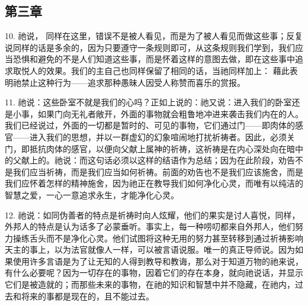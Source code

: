 
\subsection{第三章}

10.  祂说， 同样在这里，错误不是被人看见，而是为了被人看见而做这些事；反复说同样的话是多余的，因为只要遵守一条规则即可，从这条规则我们学到，我们应当恐惧和避免的不是人们知道这些事，而是怀着这样的意图去做，即在这些事中追求取悦人的效果。我们的主自己也同样保留了相同的话，当祂同样加上： 藉此表明祂禁止这种行为——追求那种愚昧人因受人称赞而喜乐的赏报。\par

11. 祂说：这些卧室不就是我们的心吗？正如上说的：祂又说：进入我们的卧室还是小事，如果门向无礼者敞开，外面的事物就会粗鲁地冲进来袭击我们内在的人。我们已经说过，外面的一切都是暂时的、可见的事物，它们通过门——即肉体的感官——进入我们的思想，并以一群虚幻的幻象喧闹地打扰祈祷者。因此，必须关门，即抵抗肉体的感官，以便向父献上属神的祈祷，这祈祷是在内心深处向在暗中的父献上的。祂说：而这句话必须以这样的结语作为总结；因为在此阶段，劝告不是我们应当祈祷，而是我们应当如何祈祷。前面的劝告也不是我们应该施舍，而是我们应怀着怎样的精神施舍，因为祂正在教导我们如何净化心灵，而唯有以纯洁的智慧之爱，一心一意追求永生，才能净化心灵。\par

12. 祂说：如同伪善者的特点是祈祷时向人炫耀，他们的果实是讨人喜悦，同样，外邦人的特点是认为话多了必蒙垂听。事实上，每一种唠叨都来自外邦人，他们努力操练舌头而不是净化心灵。他们试图将这种无用的努力甚至转移到通过祈祷影响天主的事上，以为法官就像人一样，可以被言语说服。唯一的真正导师说。因为如果使用许多言语是为了让无知的人得到教导和教诲，那么对于知道万物的祂来说，有什么必要呢？因为一切存在的事物，因着它们的存在本身，就向祂说话，并显示它们是被造就的；而那些未来的事物，在祂的知识和智慧中并不隐藏，在祂内，过去和将来的事都是现在的，且不能过去。\par

